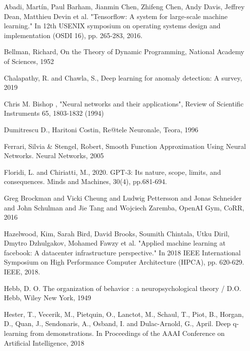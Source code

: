


\begin{thebibliography}{99}

 Abadi, Martín, Paul Barham, Jianmin Chen, Zhifeng Chen, Andy Davis, Jeffrey Dean, Matthieu Devin et al. "Tensorflow: A system for large-scale machine learning." In 12th {USENIX} symposium on operating systems design and implementation ({OSDI} 16), pp. 265-283, 2016.

 Bellman, Richard, On the Theory of Dynamic Programming, National Academy of Sciences, 1952

 Chalapathy, R. and Chawla, S., Deep learning for anomaly detection: A survey, 2019

 Chris M. Bishop , "Neural networks and their applications", Review of Scientific Instruments 65, 1803-1832 (1994)

 Dumitrescu D., Haritoni Costin, Re@tele Neuronale, Teora, 1996

	Ferrari, Silvia \& Stengel, Robert, Smooth Function Approximation Using Neural Networks. Neural Networks, 2005

 Floridi, L. and Chiriatti, M., 2020. GPT-3: Its nature, scope, limits, and consequences. Minds and Machines, 30(4), pp.681-694.

 Greg Brockman and Vicki Cheung and Ludwig Pettersson and Jonas Schneider and John Schulman and Jie Tang and Wojciech Zaremba, OpenAI Gym, CoRR, 2016

 Hazelwood, Kim, Sarah Bird, David Brooks, Soumith Chintala, Utku Diril, Dmytro Dzhulgakov, Mohamed Fawzy et al. "Applied machine learning at facebook: A datacenter infrastructure perspective." In 2018 IEEE International Symposium on High Performance Computer Architecture (HPCA), pp. 620-629. IEEE, 2018.

 Hebb, D. O.  The organization of behavior : a neuropsychological theory / D.O. Hebb, Wiley New York, 1949

 Hester, T., Vecerik, M., Pietquin, O., Lanctot, M., Schaul, T., Piot, B., Horgan, D., Quan, J., Sendonaris, A., Osband, I. and Dulac-Arnold, G.,  April. Deep q-learning from demonstrations. In Proceedings of the AAAI Conference on Artificial Intelligence, 2018


\end{thebibliography}
